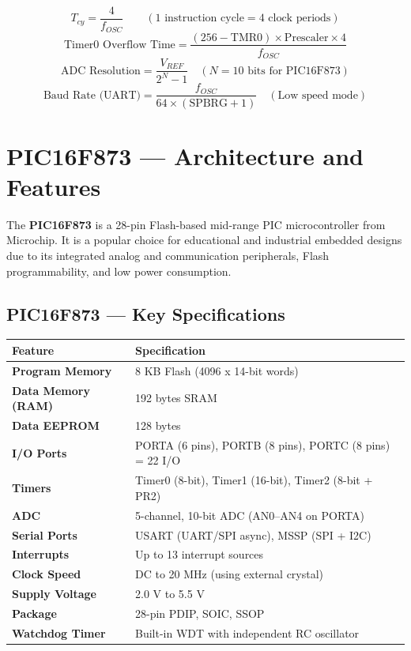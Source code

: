 \documentclass[12pt,a4paper]{article}
\renewcommand{\arraystretch}{1.45}
\begin{document}
\begin{tcolorbox}[formulabox, title={\textbf{PIC16 Key Formulas}}]
\[
T_{cy} = \frac{4}{f_{OSC}} \qquad (\text{1 instruction cycle} = 4 \text{ clock periods})
\]
\[
\text{Timer0 Overflow Time} = \frac{(256 - \text{TMR0}) \times \text{Prescaler} \times 4}{f_{OSC}}
\]
\[
\text{ADC Resolution} = \frac{V_{REF}}{2^N - 1} \quad (N = 10\text{ bits for PIC16F873})
\]
\[
\text{Baud Rate (UART)} = \frac{f_{OSC}}{64 \times (\text{SPBRG} + 1)} \quad (\text{Low speed mode})
\]
\end{tcolorbox}

\section{PIC16F873 --- Architecture and Features}

\begin{tcolorbox}[defbox, title={\textbf{PIC16F873}}]
The \textbf{PIC16F873} is a 28-pin Flash-based mid-range PIC microcontroller from Microchip. It is a popular choice for educational and industrial embedded designs due to its integrated analog and communication peripherals, Flash programmability, and low power consumption.
\end{tcolorbox}

\subsection{PIC16F873 --- Key Specifications}

\par\noindent
{\renewcommand{\arraystretch}{1.55}%
\begin{tabularx}{\linewidth}{|B{3.5cm}|Y|}
\hline
\textbf{Feature} & \textbf{Specification} \\
\hline
\textbf{Program Memory} & 8 KB Flash (4096 x 14-bit words) \\
\hline
\textbf{Data Memory (RAM)} & 192 bytes SRAM \\
\hline
\textbf{Data EEPROM} & 128 bytes \\
\hline
\textbf{I/O Ports} & PORTA (6 pins), PORTB (8 pins), PORTC (8 pins) = 22 I/O \\
\hline
\textbf{Timers} & Timer0 (8-bit), Timer1 (16-bit), Timer2 (8-bit + PR2) \\
\hline
\textbf{ADC} & 5-channel, 10-bit ADC (AN0--AN4 on PORTA) \\
\hline
\textbf{Serial Ports} & USART (UART/SPI async), MSSP (SPI + I2C) \\
\hline
\textbf{Interrupts} & Up to 13 interrupt sources \\
\hline
\textbf{Clock Speed} & DC to 20 MHz (using external crystal) \\
\hline
\textbf{Supply Voltage} & 2.0 V to 5.5 V \\
\hline
\textbf{Package} & 28-pin PDIP, SOIC, SSOP \\
\hline
\textbf{Watchdog Timer} & Built-in WDT with independent RC oscillator \\
\hline
\end{tabularx}}
\end{document}
